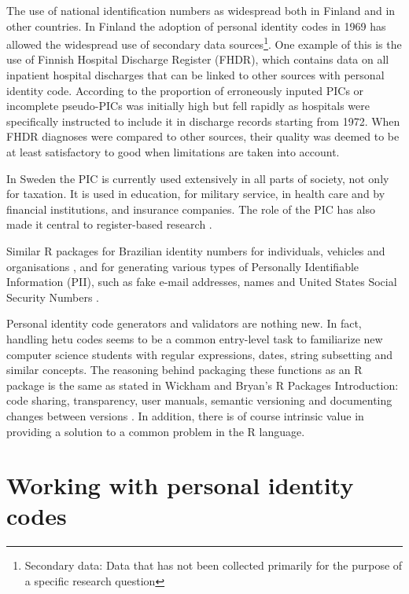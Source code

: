 The use of national identification numbers as widespread both in Finland and in other countries. In Finland the adoption of personal identity codes in 1969 has allowed the widespread use of secondary data sources\footnote{Secondary data: Data that has not been collected primarily for the purpose of a specific research question}. One example of this is the use of Finnish Hospital Discharge Register (FHDR), which contains data on all inpatient hospital discharges that can be linked to other sources with personal identity code. According to \citet{reijosund} the proportion of erroneously inputed PICs or incomplete pseudo-PICs was initially high but fell rapidly as hospitals were specifically instructed to include it in discharge records starting from 1972. When FHDR diagnoses were compared to other sources, their quality was deemed to be at least satisfactory to good when limitations are taken into account.

In Sweden the PIC is currently used extensively in all parts of society, not only for taxation. It is used in education, for military service, in health care and by financial institutions, and insurance companies. The role of the PIC has also made it central to register-based research \citep{scb2016}.


Similar R packages  for Brazilian identity numbers for individuals, vehicles and organisations \citep{numbersbr}, and  for generating various types of Personally Identifiable Information (PII), such as fake e-mail addresses, names and United States Social Security Numbers \citep{generator}.

Personal identity code generators and validators are nothing new. In fact, handling hetu codes seems to be a common entry-level task to familiarize new computer science students with regular expressions, dates, string subsetting and similar concepts. The reasoning behind packaging these functions as an R package is the same as stated in Wickham and Bryan's R Packages Introduction: code sharing, transparency, user manuals, semantic versioning and documenting changes between versions \citep{wickham}. In addition, there is of course intrinsic value in providing a solution to a common problem in the R language.

\section{Working with personal identity codes}

